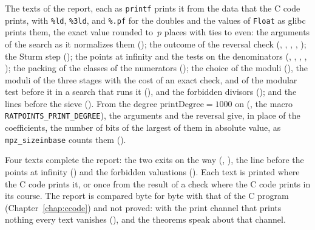 \begin{definition}\label{def:libraryReport}
  \leanok
  The texts of the report, each as \verb|printf| prints it from the data that the C code prints,
  with \verb|%ld|, \verb|%3ld|, and \verb|%.pf| for the doubles and the values of \verb|Float| as
  glibc prints them, the exact value rounded to~$p$ places with ties to even: the arguments of the
  search as it normalizes them (); the outcome of the reversal
  check (, ,
  , ,
  ); the Sturm step (); the
  points at infinity and the tests on the denominators (,
  , ,
  , ); the packing of the
  classes of the numerators (); the choice of the moduli
  (), the moduli of the three stages with the cost of an exact
  check, and of the modular test before it in a search that runs it
  (), and the forbidden divisors
  (); and the lines before the sieve
  (). From the degree $\mathrm{printDegree} = 1000$ on
  (, the macro \verb|RATPOINTS_PRINT_DEGREE|), the arguments and the
  reversal give, in place of the coefficients, the number of bits of the largest of them in absolute
  value, as \verb|mpz_sizeinbase| counts them ().
\end{definition}

Four texts complete the report: the two exits on the way (,
), the line before the points at infinity
() and the forbidden valuations
(). Each text is printed where the C code prints it, or
once from the result of a check where the C code prints in its course. The report is compared byte
for byte with that of the C program (Chapter~\ref{chap:ccode}) and not proved: with the print
channel that prints nothing every text vanishes (), and the
theorems speak about that channel.


